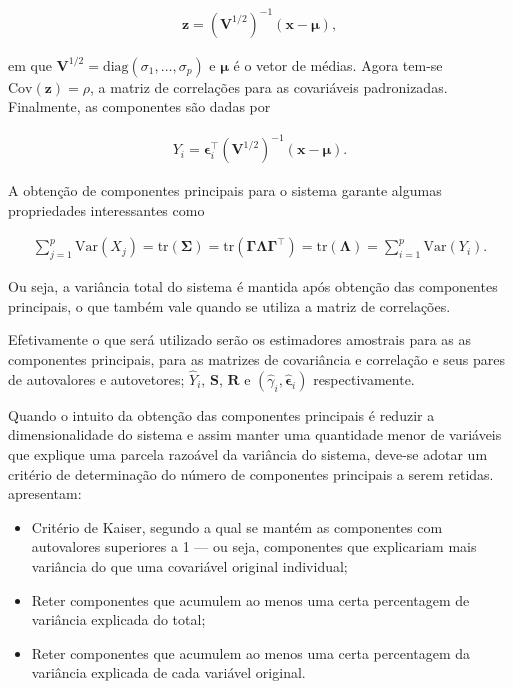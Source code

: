 \documentclass[12pt, a4paper, twoside]{report}
\numberwithin{equation}{subsection} %
\begin{document}
\begin{align}
	\mathbf{z} = \left( \mathbf{V}^{1/2}\right)^{-1} (\mathbf{x} - \boldsymbol{\mu}),
\end{align}

\noindent em que $\mathbf{V}^{1/2} = \text{diag}(\sigma_1, \dots, \sigma_p)$ e $\boldsymbol{\mu}$ é o vetor de médias. Agora tem-se $\text{Cov}(\mathbf{z}) = \rho$, a matriz de correlações para as covariáveis padronizadas. Finalmente, as componentes são dadas por

\begin{align}
	Y_i = \boldsymbol{\epsilon}_i^\top \left( \boldsymbol{V}^{1/2}\right)^{-1} (\boldsymbol{x} - \boldsymbol{\mu}).
\end{align}

A obtenção de componentes principais para o sistema garante algumas propriedades interessantes como

\begin{align}
	\sum\limits_{j = 1}^{p} \text{Var}\left( X_j \right) = \text{tr} \left( \boldsymbol{\Sigma} \right)  = \text{tr} \left( \boldsymbol{\Gamma \Lambda \Gamma^\top} \right) = \text{tr} \left( \boldsymbol{\Lambda} \right) =  \sum\limits_{i = 1}^{p} \text{Var}\left( Y_i \right).
\end{align}

\noindent Ou seja, a variância total do sistema é mantida após obtenção das componentes principais, o que também vale quando se utiliza a matriz de correlações.   

Efetivamente o que será utilizado serão os estimadores amostrais para as as componentes principais, para as matrizes de covariância e correlação e seus pares de autovalores e autovetores; $\hat{Y}_i$, $\mathbf{S}$, $\mathbf{R}$ e $(\hat{\gamma}_i, \hat{\boldsymbol{\epsilon}}_i)$ respectivamente.

Quando o intuito da obtenção das componentes principais é reduzir a dimensionalidade do sistema e assim manter uma quantidade menor de variáveis que explique uma parcela razoável da variância do sistema, deve-se adotar um critério de determinação do número de componentes principais a serem retidas. \cite{metodosmultivariados_artes} apresentam:

\begin{itemize}
	\item Critério de Kaiser, segundo a qual se mantém as componentes com autovalores superiores a 1 --- ou seja, componentes que explicariam mais variância do que uma covariável original individual; \\
	\item Reter componentes que acumulem ao menos uma certa percentagem de variância explicada do total; \\
	\item Reter componentes que acumulem ao menos uma certa percentagem da variância explicada de cada variável original.
\end{itemize}
\end{document}
